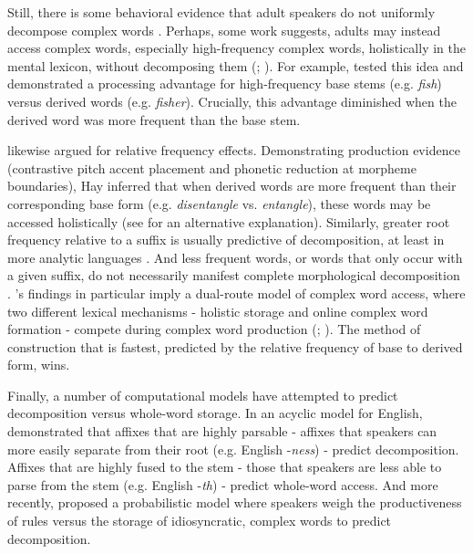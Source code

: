 \documentclass[a4paper,man,floatsintext,natbib,donotrepeattitle, apacite]{apa6}
\begin{document}
Still, there is some behavioral evidence that adult speakers do not uniformly decompose complex words \citep{taftLexicalStorageRetrieval1976}. Perhaps, some work suggests, adults may instead access complex words, especially high-frequency complex words, holistically in the mental lexicon, without decomposing them (\citealt{baayenQuantitativeAspectsMorphological1992}; \citealt{baayenFrequencyEffectsRegular2003}). For example, \citet{coleWordsMorphemesUnits1997} tested this idea and demonstrated a processing advantage for high-frequency base stems (e.g. \textit{fish}) versus derived words (e.g. \textit{fisher}). Crucially, this advantage diminished when the derived word was more frequent than the base stem. 

\citet{hayCausesConsequencesWord2003} likewise argued for relative frequency effects. Demonstrating production evidence (contrastive pitch accent placement and phonetic reduction at morpheme boundaries), Hay inferred that when derived words are more frequent than their corresponding base form (e.g. \textit{disentangle} vs. \textit{entangle}), these words may be accessed holistically (see \citealt{pluymaekersMorphologicalEffectsFine2010} for an alternative explanation). Similarly, greater root frequency relative to a suffix is usually predictive of decomposition, at least in more analytic languages \citep{smithPhoneticDetailThat2012}. And less frequent words, or words that only occur with a given suffix, do not necessarily manifest complete morphological decomposition \citep{kempsProsodicCuesMorphological2005}. 
\citet{hayCausesConsequencesWord2003}'s findings in particular imply a dual-route model of complex word access, where two different lexical mechanisms - holistic storage and online complex word formation - compete during complex word production (\citealt{baayenQuantitativeAspectsMorphological1992}; \citealt{koenigTypeUnderspecificationOnline1995}). The method of construction that is fastest, predicted by the relative frequency of base to derived form, wins. 

Finally, a number of computational models have attempted to predict decomposition versus whole-word storage. In an acyclic model for English, \citet{ingoplagSuffixOrderingMorphological2009} demonstrated that affixes that are highly parsable - affixes that speakers can more easily separate from their root (e.g. English -\textit{ness}) - predict decomposition. Affixes that are highly fused to the stem - those that speakers are less able to parse from the stem (e.g. English -\textit{th}) - predict whole-word access. And more recently, \citet{odonnellProductivityReuseLanguage2015} proposed a probabilistic model where speakers weigh the productiveness of rules versus the storage of idiosyncratic, complex words to predict decomposition. 
\end{document}

